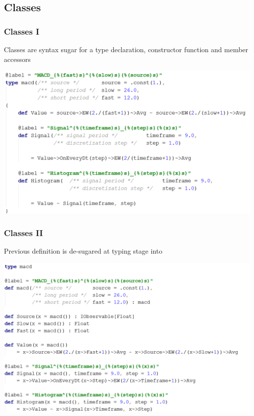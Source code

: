 \documentclass{beamer}
\begin{document}
\subsection{Classes}
\begin{frame}
\frametitle{Classes I}
Classes are syntax sugar for a type declaration, constructor function and member accessors

\includegraphics[width=1\linewidth]{macd.png}

\end{frame}
\begin{frame}
\frametitle{Classes II}
Previous definition is de-sugared at typing stage into

\includegraphics[width=1\linewidth]{macd_desugared.png}
\end{frame}
\end{document}
